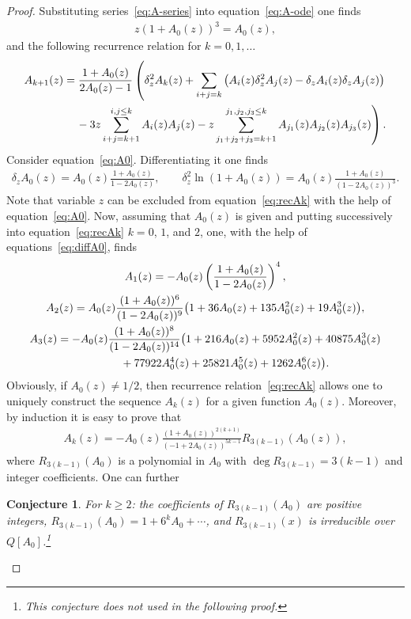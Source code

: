 \documentclass[pdftex]{sigma}
\numberwithin{equation}{section}
\newtheorem{Conjecture}[Theorem]{Conjecture}
\begin{document}
\begin{proof}Substituting series~\eqref{eq:A-series} into equation~\eqref{eq:A-ode} one finds
\begin{gather}\label{eq:A0}
z(1+A_0(z))^3=A_0(z),
\end{gather}
and the following recurrence relation for $k=0,1,\ldots$
\begin{gather}
A_{k+1}(z) =\frac{1+A_0(z)}{2A_0(z)-1}\left(\delta^2_zA_k(z)+\sum\limits_{i+j=k}\left(
A_i(z)\delta^2_zA_j(z)-\delta_zA_i(z)\delta_zA_j(z)\right)\right.\nonumber\\
 \left.\hphantom{A_{k+1}(z) =}{} -3z\sum\limits_{i+j=k+1}^{i,j\leq k}A_i(z)A_j(z)-z\sum\limits_{j_1+j_2+j_3=k+1}^{j_1,j_2,j_3\leq k}
A_{j_1}(z)A_{j_2}(z)A_{j_3}(z)\right).\label{eq:recAk}
\end{gather}
Consider equation~\eqref{eq:A0}. Differentiating it one finds
\begin{gather}\label{eq:diffA0}
\delta_zA_0(z)=A_0(z) \frac{1+A_0(z)}{1-2A_0(z)},\qquad
\delta_z^2\ln(1+A_0(z))=A_0(z) \frac{1+A_0(z)}{(1-2A_0(z))^3}.
\end{gather}
Note that variable $z$ can be excluded from equation~\eqref{eq:recAk} with the help of equation~\eqref{eq:A0}. Now, assuming
that $A_0(z)$ is given and putting successively into equation~\eqref{eq:recAk} $k=0$, $1$, and $2$, one, with the help of
equations~\eqref{eq:diffA0}, finds
\begin{gather}
A_1(z) =-A_0(z)\left(\frac{1+A_0(z)}{1-2A_0(z)}\right)^4,\label{eq:A1}\\
A_2(z) =A_0(z)\frac{(1+A_0(z))^6}{(1-2A_0(z))^9}\big(1+36A_0(z)+135A_0^2(z)+19A_0^3(z)\big),\label{eq:A2}\\
A_3(z) =-A_0(z)\frac{(1+A_0(z))^8}{(1-2A_0(z))^{14}}\big(1+216A_0(z)+5952A_0^2(z)+40875A_0^3(z) \nonumber\\
\hphantom{A_3(z) =}{} +77922A_0^4(z)+25821A_0^5(z)+1262A_0^6(z)\big).\label{eq:A3}
\end{gather}
Obviously, if $A_0(z)\neq1/2$, then recurrence relation~\eqref{eq:recAk} allows one to uniquely construct the sequence $A_k(z)$ for a given function $A_0(z)$. Moreover, by induction it is easy to prove that
\begin{gather}\label{eq:Ak-gen}
A_k(z)=-A_0(z)\frac{(1+A_0(z))^{2(k+1)}}{(-1+2A_0(z))^{5k-1}}R_{3(k-1)}(A_0(z)),
\end{gather}
where $R_{3(k-1)}(A_0)$ is a polynomial in $A_0$ with $\deg R_{3(k-1)}=3(k-1)$ and integer coefficients. One can further
\begin{Conjecture}For $k\geq2$: the coefficients of $R_{3(k-1)}(A_0)$ are positive integers,
$R_{3(k-1)}(A_0)=1+6^kA_0+\cdots$, and $R_{3(k-1)}(x)$ is irreducible over $Q[A_0]$.\footnote{This conjecture does not used in the following proof.}
\end{Conjecture}


\end{proof}
\end{document}
